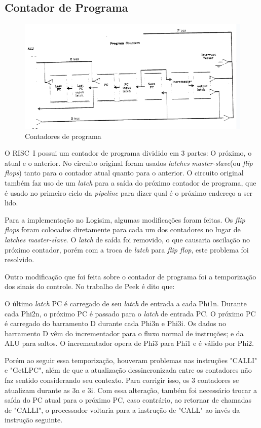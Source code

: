\documentclass[
	article,			%
	11pt,				%
	oneside,			%
	a4paper,			%
	english,			%
	brazil,				%
	sumario=tradicional
	]{abntex2}
\begin{document}
\subsection{Contador de Programa}
\begin{figure}[H]
    \centering
    \includegraphics[width=0.75\linewidth]{Original/pcPeek.png}
    \caption{Contadores de programa\cite{peek_vlsi_1983}}
    \label{fig:pcPeek}
\end{figure}
O RISC~I possui um contador de programa dividido em 3 partes: O próximo, o atual e o anterior. No circuito original foram usados \textit{latches} \textit{master-slave}(ou \textit{flip flops}) tanto para o contador atual quanto para o anterior. O circuito original também faz uso de um \textit{latch} para a saída do próximo contador de programa, que é usado no primeiro ciclo da \textit{pipeline} para dizer qual é o próximo endereço a ser lido.

Para a implementação no Logisim, algumas modificações foram feitas. Os \textit{flip flops} foram colocados diretamente para cada um dos contadores no lugar de\textit{ latches master-slave}. O \textit{latch} de saída foi removido, o que causaria oscilação no próximo contador, porém com a troca de \textit{latch} para \textit{flip flop}, este problema foi resolvido.

Outro modificação que foi feita sobre o contador de programa foi a temporização dos sinais do controle. No trabalho de Peek é dito que: 
\begin{citacao}
O último \textit{latch} PC é carregado de seu \textit{latch} de entrada a cada Phi1n. Durante cada Phi2n, o próximo PC é passado para o \textit{latch} de entrada PC. O próximo PC é carregado do barramento D durante cada Phi3n e Phi3i. Os dados no barramento D vêm do incrementador para o fluxo normal de instruções; e da ALU para saltos. O incrementador opera de Phi3 para Phi1 e é válido por Phi2.
\end{citacao}
Porém ao seguir essa temporização, houveram problemas nas instruções "CALLI" e "GetLPC", além de que a atualização dessincronizada entre os contadores não faz sentido considerando seu contexto. Para corrigir isso, os 3 contadores se atualizam durante as 3n e 3i. Com essa alteração, também foi necessário trocar a saída do PC atual para o próximo PC, caso contrário, ao retornar de chamadas de "CALLI", o processador voltaria para a instrução de "CALL" ao invés da instrução seguinte.
\end{document}
